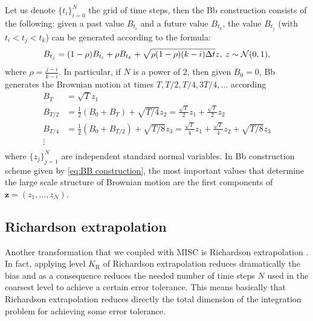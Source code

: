 Let us denote $\{t_i\}_{i=0}^{N}$ the grid of time steps, then the Bb construction \cite{glasserman2004monte} consists of the following: given a past value $B_{t_i}$ and a future value $B_{t_k}$, the value $B_{t_j}$ (with $t_i < t_j < t_k$) can be generated according to the formula:
\begin{equation}
B_{t_j}=(1-\rho) B_{t_i}+\rho B_{t_k}+ \sqrt{\rho (1-\rho)(k-i) \Delta t} z, \: z \sim \mathcal{N}(0,1) ,
\end{equation}
where $\rho=\frac{j-i}{k-i}$.  In particular, if $N$ is a power of $2$, then given $B_0=0$, Bb generates the Brownian motion at times $T, T/2,T/4,3T/4,\dots$ according
\begin{align}\label{eq:BB construction}
	B_T&=\sqrt{T}z_1\nonumber\\
	B_{T/2}&= \frac{1}{2}(B_{0}+B_{T})+\sqrt{T/4}z_2= \frac{\sqrt{T}}{2} z_1+\frac{\sqrt{T}}{2} z_2\nonumber\\
	B_{T/4}&=\frac{1}{2} (B_{0}+B_{T/2})+\sqrt{T/8}z_3= \frac{\sqrt{T}}{4} z_1+\frac{\sqrt{T}}{4} z_2+\sqrt{T/8}z_3\nonumber\\
	\vdots \nonumber\\
\end{align}
where $\{z_j\}_{j=1}^{N}$ are independent standard normal variables.  In Bb construction scheme given by \eqref{eq:BB construction}, the most important values that determine the large scale structure of Brownian motion are the first components of $\mathbf{z} = (z_1,\dots,z_N)$.



%


\subsection{Richardson extrapolation}\label{sec:Richardson extrapolation}


Another transformation that we coupled with MISC is Richardson extrapolation \cite{talay1990expansion}. In fact, applying level $K_\text{R}$ of Richardson extrapolation reduces dramatically the bias and as a consequence reduces the needed number of time steps $N$ used in the coarsest level to achieve a certain error tolerance. This means basically that Richardson extrapolation reduces directly the total dimension of the integration problem for achieving some error tolerance.


